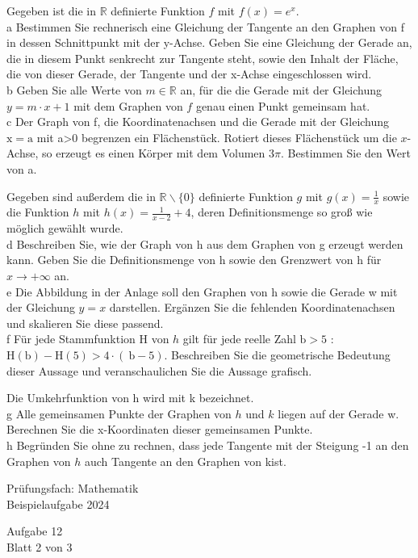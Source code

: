 \documentclass[10pt]{article}
\begin{document}
Gegeben ist die in $\mathbb{R}$ definierte Funktion $f$ mit $f(x)=e^{x}$.\\
a Bestimmen Sie rechnerisch eine Gleichung der Tangente an den Graphen von f in dessen Schnittpunkt mit der y-Achse. Geben Sie eine Gleichung der Gerade an, die in diesem Punkt senkrecht zur Tangente steht, sowie den Inhalt der Fläche, die von dieser Gerade, der Tangente und der x-Achse eingeschlossen wird.\\
b Geben Sie alle Werte von $m \in \mathbb{R}$ an, für die die Gerade mit der Gleichung $y=m \cdot x+1$ mit dem Graphen von $f$ genau einen Punkt gemeinsam hat.\\
c Der Graph von f, die Koordinatenachsen und die Gerade mit der Gleichung $\mathrm{x}=\mathrm{a}$ mit a>0 begrenzen ein Flächenstück. Rotiert dieses Flächenstück um die $x$-Achse, so erzeugt es einen Körper mit dem Volumen $3 \pi$. Bestimmen Sie den Wert von a.

Gegeben sind außerdem die in $\mathbb{R} \backslash\{0\}$ definierte Funktion $g$ mit $g(x)=\frac{1}{x}$ sowie die Funktion $h$ mit $h(x)=\frac{1}{x-2}+4$, deren Definitionsmenge so groß wie möglich gewählt wurde.\\
d Beschreiben Sie, wie der Graph von h aus dem Graphen von g erzeugt werden kann. Geben Sie die Definitionsmenge von h sowie den Grenzwert von h für $x \rightarrow+\infty$ an.\\
e Die Abbildung in der Anlage soll den Graphen von h sowie die Gerade w mit der Gleichung $y=x$ darstellen. Ergänzen Sie die fehlenden Koordinatenachsen und skalieren Sie diese passend.\\
f Für jede Stammfunktion H von $h$ gilt für jede reelle Zahl $\mathrm{b}>5$ :\\
$\mathrm{H}(\mathrm{b})-\mathrm{H}(5)>4 \cdot(\mathrm{~b}-5)$. Beschreiben Sie die geometrische Bedeutung dieser Aussage und veranschaulichen Sie die Aussage grafisch.

Die Umkehrfunktion von h wird mit k bezeichnet.\\
g Alle gemeinsamen Punkte der Graphen von $h$ und $k$ liegen auf der Gerade w. Berechnen Sie die x-Koordinaten dieser gemeinsamen Punkte.\\
h Begründen Sie ohne zu rechnen, dass jede Tangente mit der Steigung -1 an den Graphen von $h$ auch Tangente an den Graphen von kist.

Prüfungsfach: Mathematik\\
Beispielaufgabe 2024

Aufgabe 12\\
Blatt 2 von 3
\end{document}
